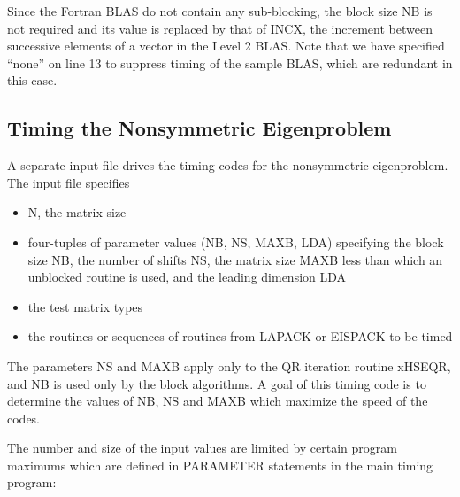 \noindent
Since the Fortran BLAS do not contain any sub-blocking, the block size
NB is not required and its value is replaced by that of INCX,
the increment between successive elements of a vector in the Level 2
BLAS.
Note that we have specified ``none'' on line 13 to suppress timing
of the sample BLAS, which are redundant in this case.


\subsection{Timing the Nonsymmetric Eigenproblem}

\dent
A separate input file drives the timing codes for the nonsymmetric 
eigenproblem. The input file specifies
\begin{itemize}
\item N, the matrix size
\item four-tuples of parameter values (NB, NS, MAXB, LDA)
specifying the block size NB, 
the number of shifts NS, the matrix size MAXB less than
which an unblocked routine is used, and the leading dimension LDA
\item the test matrix types
\item the routines or sequences of routines from
LAPACK or EISPACK to be timed
\end{itemize}
The parameters NS and MAXB apply only
to the QR iteration routine xHSEQR, and
NB is used only by the block algorithms.
A goal of this timing code is to determine
the values of NB, NS and MAXB which maximize
the speed of the codes.

The number and size of the input values are limited by certain program
maximums which are defined in PARAMETER statements in the
main timing program:



